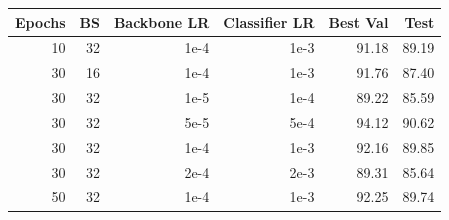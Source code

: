 \begin{tabular}{rrrrrr}
\toprule
Epochs & BS & Backbone LR & Classifier LR & Best Val & Test \\
\midrule
10 & 32 & 1e-4 & 1e-3 & 91.18 & 89.19 \\
30 & 16 & 1e-4 & 1e-3 & 91.76 & 87.40 \\
30 & 32 & 1e-5 & 1e-4 & 89.22 & 85.59 \\
30 & 32 & 5e-5 & 5e-4 & 94.12 & 90.62 \\
30 & 32 & 1e-4 & 1e-3 & 92.16 & 89.85 \\
30 & 32 & 2e-4 & 2e-3 & 89.31 & 85.64 \\
50 & 32 & 1e-4 & 1e-3 & 92.25 & 89.74 \\
\bottomrule
\end{tabular}
